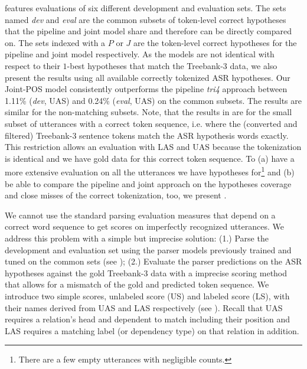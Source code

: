 \documentclass[11pt,letterpaper]{article}
\begin{document}
 features evaluations of six different development and evaluation sets. The sets named \emph{dev} and \emph{eval} are the common subsets of token-level correct hypotheses that the pipeline and joint model share and therefore can be directly compared on. The sets indexed with a $P$ or $J$ are the token-level correct hypotheses for the pipeline and joint model respectively. As the models are not identical with respect to their $1$-best hypotheses that match the Treebank-3 data, we also present the results using all available correctly tokenized ASR hypotheses. Our Joint-POS model consistently outperforms the pipeline \emph{tri4} approach between 1.11\% (\emph{dev}, UAS) and 0.24\% (\emph{eval}, UAS) on the common subsets. The results are similar for the non-matching subsets. Note, that the results in  are for the small subset of utterances with a correct token sequence, i.e. where the (converted and filtered) Treebank-3 sentence tokens match the ASR hypothesis words exactly. This restriction allows an evaluation with LAS and UAS because the tokenization is identical and we have gold data for this correct token sequence. To (a) have a more extensive evaluation on all the utterances we have hypotheses for\footnote{There are a few empty utterances with negligible counts.} and (b) be able to compare the pipeline and joint approach on the hypotheses coverage and close misses of the correct tokenization, too, we present .

We cannot use the standard parsing evaluation measures that depend on a correct word sequence to get scores on imperfectly recognized utterances. We address this problem with a simple but imprecise solution: (1.) Parse the development and evaluation set using the parser models previously trained and tuned on the common sets (see ); (2.) Evaluate the parser predictions on the ASR hypotheses against the gold Treebank-3 data with a imprecise scoring method that allows for a mismatch of the gold and predicted token sequence. We introduce two simple scores, unlabeled score (US) and labeled score (LS), with their names derived from UAS and LAS respectively (see ). Recall that UAS requires a relation's head and dependent to match including their position and LAS requires a matching label (or dependency type) on that relation in addition.
\end{document}
